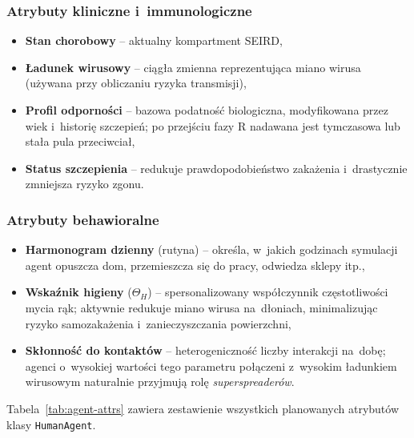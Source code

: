 \documentclass[polish]{projectreport}
\begin{document}
\subsubsection{Atrybuty kliniczne i~immunologiczne}
\label{sec:clinical-attrs}

\begin{itemize}
  \item \textbf{Stan chorobowy} -- aktualny kompartment SEIRD,
  \item \textbf{Ładunek wirusowy} -- ciągła zmienna reprezentująca miano wirusa
        (używana przy obliczaniu ryzyka transmisji),
  \item \textbf{Profil odporności} -- bazowa podatność biologiczna, modyfikowana
        przez wiek i~historię szczepień; po przejściu fazy R nadawana jest
        tymczasowa lub stała pula przeciwciał,
  \item \textbf{Status szczepienia} -- redukuje prawdopodobieństwo zakażenia
        i~drastycznie zmniejsza ryzyko zgonu.
\end{itemize}

\subsubsection{Atrybuty behawioralne}
\label{sec:behavioral-attrs}

\begin{itemize}
  \item \textbf{Harmonogram dzienny} (rutyna) -- określa, w~jakich godzinach
        symulacji agent opuszcza dom, przemieszcza się do pracy, odwiedza
        sklepy itp.,
  \item \textbf{Wskaźnik higieny} ($\Theta_H$) -- spersonalizowany współczynnik
        częstotliwości mycia rąk; aktywnie redukuje miano wirusa na~dłoniach,
        minimalizując ryzyko samozakażenia i~zanieczyszczania powierzchni,
  \item \textbf{Skłonność do kontaktów} -- heterogeniczność liczby interakcji
        na~dobę; agenci o~wysokiej wartości tego parametru połączeni z~wysokim
        ładunkiem wirusowym naturalnie przyjmują rolę \textit{superspreaderów}.
\end{itemize}

Tabela~\ref{tab:agent-attrs} zawiera zestawienie wszystkich planowanych
atrybutów klasy \texttt{HumanAgent}.
\end{document}
